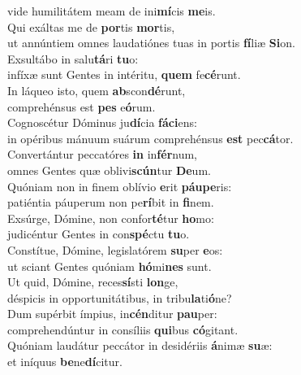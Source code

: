 \oddverse vide humilitátem meam de ini\textbf{mí}cis \textbf{me}is.\\
\evenverse Qui exáltas me de \textbf{por}tis \textbf{mor}tis,~\*\\
\evenverse ut annúntiem omnes laudatiónes tuas in portis \textbf{fí}liæ \textbf{Si}on.\\
\oddverse Exsultábo in salu\textbf{tá}ri \textbf{tu}o:~\*\\
\oddverse infíxæ sunt Gentes in intéritu, \textbf{quem} fe\textbf{cé}runt.\\
\evenverse In láqueo isto, quem \textbf{ab}scon\textbf{dé}runt,~\*\\
\evenverse comprehénsus est \textbf{pes} e\textbf{ó}rum.\\
\oddverse Cognoscétur Dóminus ju\textbf{dí}cia \textbf{fá}\textbf{ci}ens:~\*\\
\oddverse in opéribus mánuum suárum comprehénsus \textbf{est} pec\textbf{cá}tor.\\
\evenverse Convertántur peccatóres \textbf{in} in\textbf{fér}num,~\*\\
\evenverse omnes Gentes quæ oblivi\textbf{scún}tur \textbf{De}um.\\
\oddverse Quóniam non in finem oblívio \textbf{e}rit \textbf{páu}\textbf{pe}ris:~\*\\
\oddverse patiéntia páuperum non pe\textbf{rí}bit in \textbf{fi}nem.\\
\evenverse Exsúrge, Dómine, non confor\textbf{té}tur \textbf{ho}mo:~\*\\
\evenverse judicéntur Gentes in con\textbf{spé}ctu \textbf{tu}o.\\
\oddverse Constítue, Dómine, legislatórem \textbf{su}per \textbf{e}os:~\*\\
\oddverse ut sciant Gentes quóniam \textbf{hó}mi\textbf{nes} sunt.\\
\evenverse Ut quid, Dómine, reces\textbf{sí}sti \textbf{lon}ge,~\*\\
\evenverse déspicis in opportunitátibus, in tribu\textbf{la}ti\textbf{ó}ne?\\
\oddverse Dum supérbit ímpius, in\textbf{cén}ditur \textbf{pau}per:~\*\\
\oddverse comprehendúntur in consíliis \textbf{qui}bus \textbf{có}gitant.\\
\evenverse Quóniam laudátur peccátor in desidériis \textbf{á}nimæ \textbf{su}æ:~\*\\
\evenverse et iníquus \textbf{be}ne\textbf{dí}citur.\\
